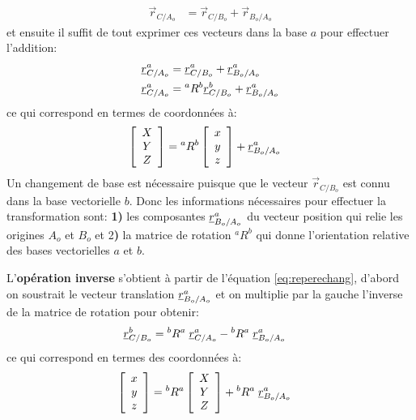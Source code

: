 \begin{align}
\vec{r}_{C/A_o}   &= \vec{r}_{C/B_o}  + \vec{r}_{B_o/A_o} 
\end{align} 
et ensuite il suffit de tout exprimer ces vecteurs dans la base $a$ pour effectuer l'addition:
\begin{align}
\underline{r}_{C/A_o}^a &=         \underline{r}_{C/B_o}^a  + \underline{r}_{B_o/A_o}^a  \\
\underline{r}_{C/A_o}^a &= {}^aR^b \underline{r}_{C/B_o}^b  + \underline{r}_{B_o/A_o}^a 
\label{eq:reperechang}
\end{align} 
ce qui correspond en termes de coordonnées à: 
\begin{align}
\left[ \begin{array}{c} 
X \\ Y \\ Z
\end{array} \right]  &=  
 {}^aR^b
\left[ \begin{array}{c} 
x \\ y \\ z
\end{array} \right] + \underline{r}_{B_o/A_o}^a 
\end{align} 
Un changement de base est nécessaire puisque que le vecteur $\vec{r}_{C/B_o}$ est connu dans la base vectorielle $b$. Donc les informations nécessaires pour effectuer la transformation sont: \textbf{1)} les composantes $\underline{r}_{B_o/A_o}^a$ du vecteur position qui relie les origines $A_o$ et $B_o$ et 2\textbf{)} la matrice de rotation $^aR^b$ qui donne l'orientation relative des bases vectorielles $a$ et $b$. 

L'\textbf{opération inverse} s'obtient à partir de l'équation \eqref{eq:reperechang}, d'abord on soustrait le vecteur translation $\underline{r}_{B_o/A_o}^a$ et on multiplie par la gauche l'inverse de la matrice de rotation pour obtenir:
\begin{align}
\underline{r}_{C/B_o}^b &= {}^bR^a \; \underline{r}_{C/A_o}^a - {}^bR^a \; \underline{r}_{B_o/A_o}^a 
\label{eq:reperechanginv}
\end{align} 
ce qui correspond en termes des coordonnées à: 
\begin{align}
\left[ \begin{array}{c} 
x \\ y \\ z
\end{array} \right]  &=  
 {}^bR^a
\left[ \begin{array}{c} 
X \\ Y \\ Z
\end{array} \right] + {}^bR^a \; \underline{r}_{B_o/A_o}^a 
\end{align} 




